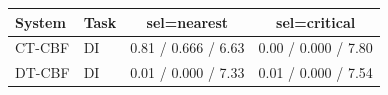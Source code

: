 \begin{tabular}{llcc}
\hline
System & Task & sel=nearest & sel=critical \\
\hline
CT-CBF & DI & 0.81 / 0.666 / 6.63 & 0.00 / 0.000 / 7.80 \\
DT-CBF & DI & 0.01 / 0.000 / 7.33 & 0.01 / 0.000 / 7.54 \\
\hline
\end{tabular}
